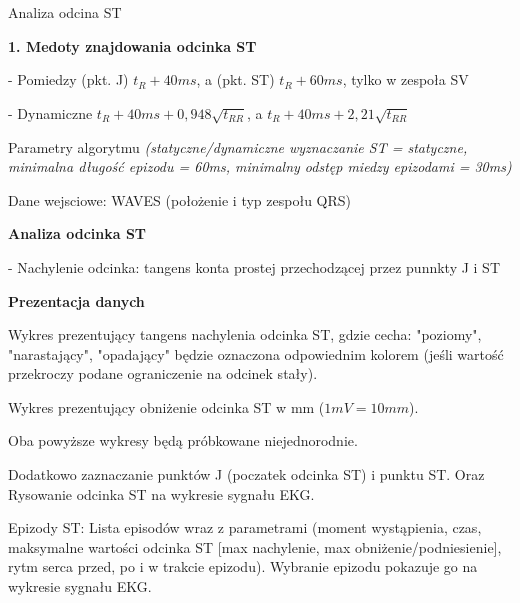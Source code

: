 \documentclass[11pt,a4paper]{report}
\begin{document}
\begin{center}
  Analiza odcina ST
\end{center}

\textbf{1. Medoty znajdowania odcinka ST}

 - Pomiedzy (pkt. J) $t_R+40ms$, a (pkt. ST) $t_R+60ms$, tylko w zespoła SV

 - Dynamiczne $t_R+40ms+0,948\sqrt{t_{RR}}$, a $t_R+40ms+2,21\sqrt{t_{RR}}$

 Parametry algorytmu \emph{(statyczne/dynamiczne wyznaczanie ST = statyczne, minimalna
 długość epizodu = 60ms, minimalny odstęp miedzy epizodami = 30ms)}

 Dane wejsciowe: WAVES (położenie i typ zespołu QRS)

\textbf{Analiza odcinka ST}

  - Nachylenie odcinka: tangens konta prostej przechodzącej przez punnkty J i
  ST

\textbf{Prezentacja danych}

  Wykres prezentujący tangens nachylenia odcinka ST, gdzie cecha: "poziomy",
  "narastający", "opadający" będzie oznaczona odpowiednim kolorem (jeśli
  wartość przekroczy podane ograniczenie na odcinek stały).

  Wykres prezentujący obniżenie odcinka ST w mm ($1mV = 10mm$).

  Oba powyższe wykresy będą próbkowane niejednorodnie.

  Dodatkowo zaznaczanie punktów J (poczatek odcinka ST) i punktu ST. Oraz
  Rysowanie odcinka ST na wykresie sygnału EKG.

  Epizody ST: Lista episodów wraz z parametrami (moment wystąpienia, czas,
  maksymalne wartości odcinka ST [max nachylenie, max obniżenie/podniesienie],
  rytm serca przed, po i w trakcie epizodu). Wybranie epizodu pokazuje go na
  wykresie sygnału EKG.
\end{document}
